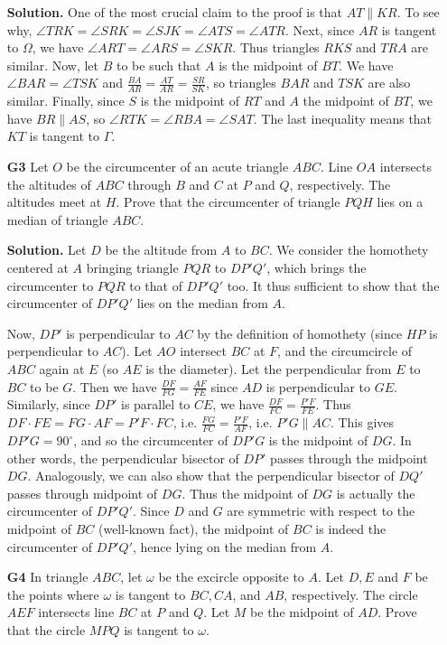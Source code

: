 \documentclass[11pt,a4paper]{article}
\begin{document}
\begin{enumerate}
	\textbf{Solution.} One of the most crucial claim to the proof is that $AT\parallel KR$. To see why, $\angle TRK = \angle SRK = \angle SJK = \angle ATS=\angle ATR$. Next, since $AR$ is tangent to $\Omega$, we have $\angle ART=\angle ARS=\angle SKR$. Thus triangles $RKS$ and $TRA$ are similar. Now, let $B$ to be such that $A$ is the midpoint of $BT$. We have $\angle BAR=\angle TSK$ and $\frac{BA}{AR}=\frac{AT}{AR}=\frac{SR}{SK}$, so triangles $BAR$ and $TSK$ are also similar. Finally, since $S$ is the midpoint of $RT$ and $A$ the midpoint of $BT$, we have $BR\parallel AS$, so $\angle RTK=\angle RBA=\angle SAT$. The last inequality means that $KT$ is tangent to $\Gamma$. 
	
	\item[\textbf{G3}] Let $O$ be the circumcenter of an acute triangle $ABC$. Line $OA$ intersects the altitudes of  $ABC$ through $B$ and $C$ at $P$ and $Q$, respectively. The altitudes meet at $H$. Prove that the circumcenter of triangle $PQH$ lies on a median of triangle $ABC$. 
    
    \textbf{Solution.} Let $D$ be the altitude from $A$ to $BC$. We consider the homothety centered at $A$ bringing triangle $PQR$ to $DP'Q'$, which brings the circumcenter to $PQR$ to that of $DP'Q'$ too. It thus sufficient to show that the circumcenter of $DP'Q'$ lies on the median from $A$. 
    
    Now, $DP'$ is perpendicular to $AC$ by the definition of homothety (since $HP$ is perpendicular to $AC$). Let $AO$ intersect $BC$ at $F$, and the circumcircle of $ABC$ again at $E$ (so $AE$ is the diameter). Let the perpendicular from $E$ to $BC$ to be $G$. Then we have $\frac{DF}{FG}=\frac{AF}{FE}$ since $AD$ is perpendicular to $GE$. Similarly, since $DP'$ is parallel to $CE$, we have $\frac{DF}{FC}=\frac{P'F}{FE}$. Thus $DF\cdot FE=FG\cdot AF=P'F\cdot FC$, i.e. $\frac{FG}{FC}=\frac{P'F}{AF}$, i.e. $P'G\parallel AC$. This gives $DP'G=90^{\circ}$, and so the circumcenter of $DP'G$ is the midpoint of $DG$. In other words, the perpendicular bisector of $DP'$ passes through the midpoint $DG$. Analogously, we can also show that the perpendicular bisector of $DQ'$ passes through midpoint of $DG$. Thus the midpoint of $DG$ is actually the circumcenter of $DP'Q'$. Since $D$ and $G$ are symmetric with respect to the midpoint of $BC$ (well-known fact), the midpoint of $BC$ is indeed the circumcenter of $DP'Q'$, hence lying on the median from $A$. 
    	
	\item[\textbf{G4}] In triangle $ABC$, let $\omega$ be the excircle opposite to $A$. Let $D, E$ and $F$ be the points where $\omega$ is tangent to $BC, CA$, and $AB$, respectively. The circle $AEF$ intersects line $BC$ at $P$ and $Q$. Let $M$ be the midpoint of $AD$. Prove that the circle $MPQ$ is tangent to $\omega$.
	

\end{enumerate}
\end{document}
